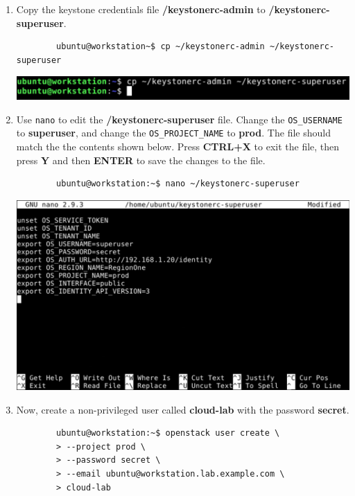 \documentclass[letterpaper, 12pt]{article}
\begin{document}
\begin{enumerate}
    \item Copy the keystone credentials file \textbf{\texttildemid/keystonerc-admin} to
    \textbf{\texttildemid/keystonerc-superuser}.
    \begin{lstlisting}
        ubuntu@workstation~$ cp ~/keystonerc-admin ~/keystonerc-superuser
    \end{lstlisting}

    \begin{center}
        \includegraphics[width=\linewidth]{images/part1/step7.png}
    \end{center}

    \item Use \texttt{nano} to edit the \textbf{\texttildemid/keystonerc-superuser} file. Change the
    \texttt{OS\_USERNAME} to \textbf{superuser}, and change the \texttt{OS\_PROJECT\_NAME} to \textbf{prod}. The file
    should match the the contents shown below. Press \textbf{CTRL+X} to exit the file, then press \textbf{Y} and then
    \textbf{ENTER} to save the changes to the file.
    \begin{lstlisting}
        ubuntu@workstation:~$ nano ~/keystonerc-superuser
    \end{lstlisting}    

    \begin{center}
        \includegraphics[width=\linewidth]{images/part1/step8.png}
    \end{center}

    \item Now, create a non-privileged user called \textbf{cloud-lab} with the password \textbf{secret}.
    \begin{lstlisting}
        ubuntu@workstation:~$ openstack user create \
        > --project prod \
        > --password secret \
        > --email ubuntu@workstation.lab.example.com \
        > cloud-lab
    \end{lstlisting}


\end{enumerate}
\end{document}
